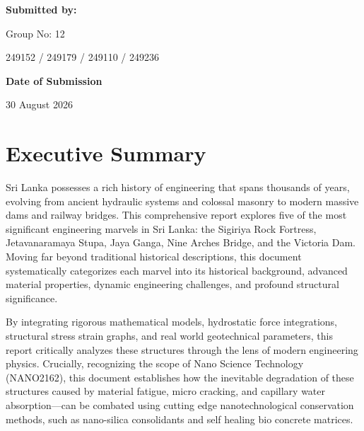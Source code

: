 \documentclass[12pt,a4paper]{report}
\begin{document}
\begin{titlepage}
\begin{minipage}[t]{0.47\textwidth}
			{\large\bfseries Submitted by:}
			
			\vspace{0.18cm}
			
			{\normalsize Group No: 12}
			
			\vspace{0.12cm}
			
			{\normalsize
				249152 / 249179 / 249110 / 249236}
			
		\end{minipage}
		
		\vfill
		
		\begin{center}
			
			{\large\bfseries Date of Submission}
			
			\vspace{0.18cm}
			
			{\normalsize 30 August 2026}
			
		\end{center}
		
		\vspace{0.35cm}
		
	\end{titlepage}
	
	\setcounter{page}{1}
	
	\chapter*{Executive Summary}
	
	Sri Lanka possesses a rich history of engineering that spans thousands of years, evolving from ancient hydraulic systems and colossal masonry to modern massive dams and railway bridges. This comprehensive report explores five of the most significant engineering marvels in Sri Lanka: the Sigiriya Rock Fortress, Jetavanaramaya Stupa, Jaya Ganga, Nine Arches Bridge, and the Victoria Dam. Moving far beyond traditional historical descriptions, this document systematically categorizes each marvel into its historical background, advanced material properties, dynamic engineering challenges, and profound structural significance.
	
	By integrating rigorous mathematical models, hydrostatic force integrations, structural stress strain graphs, and real world geotechnical parameters, this report critically analyzes these structures through the lens of modern engineering physics. Crucially, recognizing the scope of Nano Science Technology (NANO2162), this document establishes how the inevitable degradation of these structures caused by material fatigue, micro cracking, and capillary water absorption—can be combated using cutting edge nanotechnological conservation methods, such as nano-silica consolidants and self healing bio concrete matrices.
	
\end{document}
